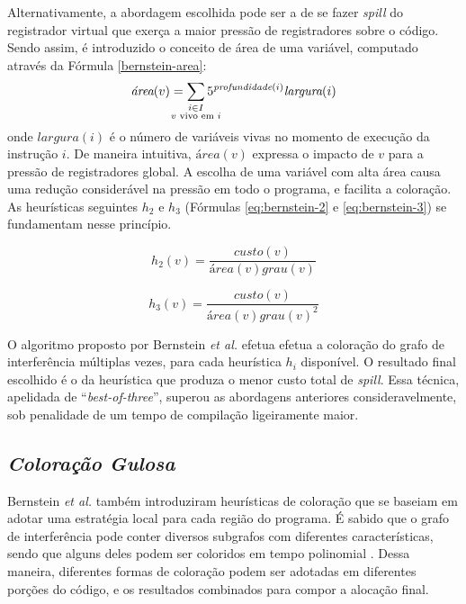 \documentclass[
	12pt,				%
	openright,			%
	twoside,			%
	a4paper,			%
	tcc,			%
	]{ABNT-DC-UEL}
\begin{document}
Alternativamente, a abordagem escolhida pode ser a de se fazer \textit{spill} do registrador virtual que exerça a maior pressão de registradores sobre o código. Sendo assim, é introduzido o conceito de área de uma variável, computado através da Fórmula \ref{bernstein-area}:
\begin{equation}
    \textit{área}(v) = \sum_{\mathclap{\substack{i \in I\\v\text{ vivo em }i}}} 5 ^ {\textit{profundidade}(i)} \textit{largura}(i)
    \label{bernstein-area}
\end{equation}
onde $\mathit{largura}(i)$ é o número de variáveis vivas no momento de execução da instrução $i$. De maneira intuitiva, $\textit{área}(v)$ expressa o impacto de $v$ para a pressão de registradores global. A escolha de uma variável com alta área causa uma redução considerável na pressão em todo o programa, e facilita a coloração. As heurísticas seguintes $h_2$ e $h_3$ (Fórmulas \ref{eq:bernstein-2} e \ref{eq:bernstein-3}) se fundamentam nesse princípio.

\begin{equation}
    h_2(v) = \frac{\mathit{custo}(v)}
                  {\textit{área}(v)\mathit{grau}(v)}
    \label{eq:bernstein-2}
\end{equation}

\begin{equation}
    h_3(v) = \frac{\mathit{custo}(v)}
                  {\textit{área}(v) \mathit{grau}(v) ^ 2}
    \label{eq:bernstein-3}
\end{equation}

O algoritmo proposto por Bernstein \textit{et al.} efetua efetua a coloração do grafo de interferência múltiplas vezes, para cada heurística $h_i$ disponível. O resultado final escolhido é o da heurística que produza o menor custo total de \textit{spill}. Essa técnica, apelidada de ``\textit{best-of-three}'', superou as abordagens anteriores consideravelmente, sob penalidade de um tempo de compilação ligeiramente maior.

\subsection{\textit{Coloração Gulosa}}

Bernstein \textit{et al.} \cite{bernstein:89} também introduziram heurísticas de coloração que se baseiam em adotar uma estratégia local para cada região do programa. É sabido que o grafo de interferência pode conter diversos subgrafos com diferentes características, sendo que alguns deles podem ser coloridos em tempo polinomial \cite{golumbic:04, dagan:88}. Dessa maneira, diferentes formas de coloração podem ser adotadas em diferentes porções do código, e os resultados combinados para compor a alocação final.
\end{document}
